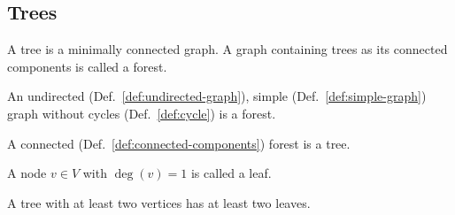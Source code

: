 \subsection{Trees} \label{subsec:trees}
A tree is a minimally connected graph.
A graph containing trees as its connected components is called a forest.
\begin{definition}[Forest]\label{def:forest}
An undirected (Def.~\ref{def:undirected-graph}), simple (Def.~\ref{def:simple-graph}) graph without cycles (Def.~\ref{def:cycle}) is a forest.
\end{definition}
\begin{definition}[Tree]\label{def:tree}
A connected (Def.~\ref{def:connected-components}) forest is a tree. %
\end{definition}
\begin{definition}[Leaf]\label{def:leaf}
A node \(v\in V\) with \(\deg(v)=1\) is called a leaf.
\end{definition}
\begin{theorem}\label{thm:atleast-two-leaves}
  A tree with at least two vertices has at least two leaves.
\end{theorem}
